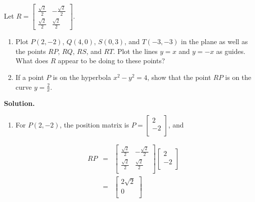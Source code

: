 \documentclass{ximera}
\begin{document}
\begin{ex}  \label{rotationmatrixex} Let $R = \left[ \begin{array}{rr} \frac{\sqrt{2}}{2} & -\frac{\sqrt{2}}{2} \\ [3pt] \frac{\sqrt{2}}{2} & \frac{\sqrt{2}}{2} \end{array} \right]$.

\begin{enumerate}

\item Plot $P(2,-2)$, $Q(4,0)$, $S(0,3)$, and $T(-3,-3)$ in the plane as well as the points $RP$, $RQ$, $RS$, and $RT$. Plot the lines $y=x$ and $y=-x$ as guides.  What does $R$ appear to be doing to these points?

\item  If a point $P$ is on the hyperbola $x^2-y^2=4$, show that the point $RP$ is on the curve $y = \frac{2}{x}$.


\end{enumerate}

{\bf Solution.}  \begin{enumerate} \item  For $P(2,-2)$, the position matrix is  $P = \left[ \begin{array}{r} 2 \\ -2 \\ \end{array} \right]$, and 

\[\begin{array}{rcl}

RP & = &  \left[ \begin{array}{rr} \frac{\sqrt{2}}{2} & -\frac{\sqrt{2}}{2} \\ [3pt] \frac{\sqrt{2}}{2} & \frac{\sqrt{2}}{2} \\ \end{array} \right]\left[ \begin{array}{r} 2 \\ [3pt] -2 \\ \end{array} \right] \\ [13pt]

& = & \left[ \begin{array}{r} 2\sqrt{2} \\ 0 \\ \end{array} \right] \\

\end{array}\]


\end{enumerate}
\end{ex}
\end{document}
